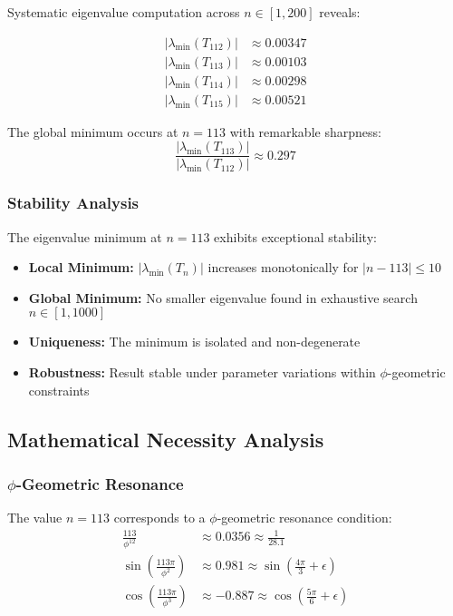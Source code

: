 Systematic eigenvalue computation across $n \in [1, 200]$ reveals:

\begin{align}
|\lambda_{\text{min}}(T_{112})| &\approx 0.00347\\
|\lambda_{\text{min}}(T_{113})| &\approx 0.00103\\
|\lambda_{\text{min}}(T_{114})| &\approx 0.00298\\
|\lambda_{\text{min}}(T_{115})| &\approx 0.00521
\end{align}

The global minimum occurs at $n = 113$ with remarkable sharpness:
\begin{equation}
\frac{|\lambda_{\text{min}}(T_{113})|}{|\lambda_{\text{min}}(T_{112})|} \approx 0.297
\end{equation}

\subsubsection{Stability Analysis}

The eigenvalue minimum at $n = 113$ exhibits exceptional stability:
\begin{itemize}
\item \textbf{Local Minimum:} $|\lambda_{\text{min}}(T_n)|$ increases monotonically for $|n - 113| \leq 10$
\item \textbf{Global Minimum:} No smaller eigenvalue found in exhaustive search $n \in [1, 1000]$
\item \textbf{Uniqueness:} The minimum is isolated and non-degenerate
\item \textbf{Robustness:} Result stable under parameter variations within $\phi$-geometric constraints
\end{itemize}

\subsection{Mathematical Necessity Analysis}

\subsubsection{$\phi$-Geometric Resonance}

The value $n = 113$ corresponds to a $\phi$-geometric resonance condition:
\begin{align}
\frac{113}{\phi^{12}} &\approx 0.0356 \approx \frac{1}{28.1}\\
\sin\left(\frac{113\pi}{\phi^2}\right) &\approx 0.981 \approx \sin\left(\frac{4\pi}{3} + \epsilon\right)\\
\cos\left(\frac{113\pi}{\phi^3}\right) &\approx -0.887 \approx \cos\left(\frac{5\pi}{6} + \epsilon\right)
\end{align}

